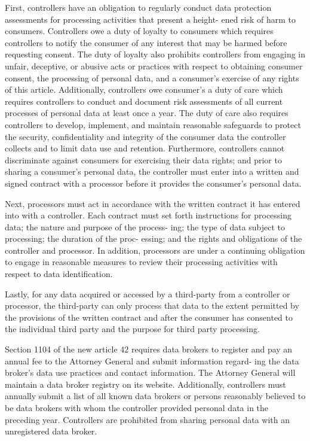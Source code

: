 First, controllers have an obligation to regularly conduct data
protection assessments for processing activities that present a height-
ened risk of harm to consumers. Controllers owe a duty of loyalty to
consumers which requires controllers to notify the consumer of any
interest that may be harmed before requesting consent. The duty of
loyalty also prohibits controllers from engaging in unfair, deceptive,
or abusive acts or practices with respect to obtaining consumer consent,
the processing of personal data, and a consumer's exercise of any rights
of this article. Additionally, controllers owe consumer's a duty of care
which requires controllers to conduct and document risk assessments of
all current processes of personal data at least once a year. The duty of
care also requires controllers to develop, implement, and maintain
reasonable safeguards to protect the security, confidentiality and
integrity of the consumer data the controller collects and to limit data
use and retention. Furthermore, controllers cannot discriminate against
consumers for exercising their data rights; and prior to sharing a
consumer's personal data, the controller must enter into a written and
signed contract with a processor before it provides the consumer's
personal data.

Next, processors must act in accordance with the written contract it has
entered into with a controller. Each contract must set forth
instructions for processing data; the nature and purpose of the process-
ing; the type of data subject to processing; the duration of the proc-
essing; and the rights and obligations of the controller and processor.
In addition, processors are under a continuing obligation to engage in
reasonable measures to review their processing activities with respect
to data identification.

Lastly, for any data acquired or accessed by a third-party from a
controller or processor, the third-party can only process that data to
the extent permitted by the provisions of the written contract and after
the consumer has consented to the individual third party and the purpose
for third party processing.

Section 1104 of the new article 42 requires data brokers to register and
pay an annual fee to the Attorney General and submit information regard-
ing the data broker's data use practices and contact information. The
Attorney General will maintain a data broker registry on its website.
Additionally, controllers must annually submit a list of all known data
brokers or persons reasonably believed to be data brokers with whom the
controller provided personal data in the preceding year. Controllers are
prohibited from sharing personal data with an unregistered data broker.

